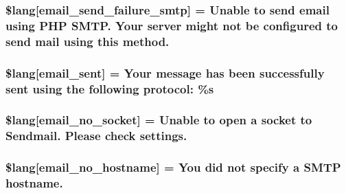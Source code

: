 \subsubsection[{\$lang}]{\setlength{\rightskip}{0pt plus 5cm}\$lang\mbox{[}\textquotesingle{}email\+\_\+send\+\_\+failure\+\_\+smtp\textquotesingle{}\mbox{]} = \textquotesingle{}Unable to send email using P\+H\+P S\+M\+T\+P. Your server might not be configured to send mail using this method.\textquotesingle{}}\label{system_2language_2english_2email__lang_8php_a37e19fc7057ba5d5300dd3e83cefc5a2}
\hypertarget{system_2language_2english_2email__lang_8php_a7e5c67019fdffb596af1af5a94247ba9}{}
\subsubsection[{\$lang}]{\setlength{\rightskip}{0pt plus 5cm}\$lang\mbox{[}\textquotesingle{}email\+\_\+sent\textquotesingle{}\mbox{]} = \textquotesingle{}Your message has been successfully sent using the following protocol\+: \%s\textquotesingle{}}\label{system_2language_2english_2email__lang_8php_a7e5c67019fdffb596af1af5a94247ba9}
\hypertarget{system_2language_2english_2email__lang_8php_a78f8be783ca93e91af775994ddc87cb7}{}
\subsubsection[{\$lang}]{\setlength{\rightskip}{0pt plus 5cm}\$lang\mbox{[}\textquotesingle{}email\+\_\+no\+\_\+socket\textquotesingle{}\mbox{]} = \textquotesingle{}Unable to open {\bf a} socket to Sendmail. Please check settings.\textquotesingle{}}\label{system_2language_2english_2email__lang_8php_a78f8be783ca93e91af775994ddc87cb7}
\hypertarget{system_2language_2english_2email__lang_8php_a03905b414e05a5d3cfd0fe88868615f5}{}
\subsubsection[{\$lang}]{\setlength{\rightskip}{0pt plus 5cm}\$lang\mbox{[}\textquotesingle{}email\+\_\+no\+\_\+hostname\textquotesingle{}\mbox{]} = \textquotesingle{}You did not specify {\bf a} S\+M\+T\+P hostname.\textquotesingle{}}\label{system_2language_2english_2email__lang_8php_a03905b414e05a5d3cfd0fe88868615f5}
\hypertarget{system_2language_2english_2email__lang_8php_a3d70a704117491053ad9c0b4065ecd3f}{}
